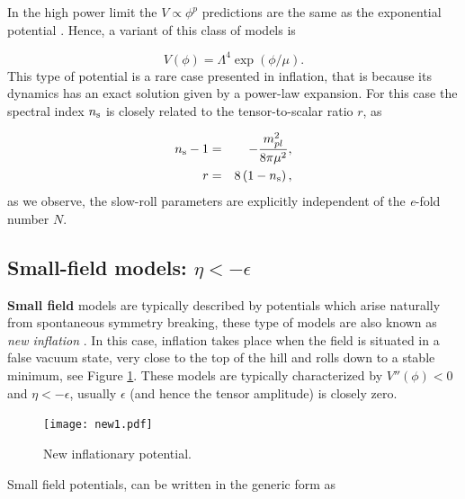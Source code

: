 \documentclass{rmaa}
\begin{document}
\noindent
In the high power limit the $V \propto \phi^p$ predictions are the same as the exponential 
potential \citep{La}. Hence, a variant of this class of models is 

\begin{equation}
V\left(\phi\right) = \Lambda^4 \exp\left(\phi / \mu\right).
\end{equation}
%
 This type of potential is a rare case presented in inflation, that is because its 
 dynamics has an exact solution given by a power-law expansion.
 For this case the spectral index $n_{\rm s}$ is closely related to the tensor-to-scalar ratio $r$, as 

\begin{eqnarray}
n_{\rm s}-1&=&-\frac{m^2_{pl}}{8\pi \mu^2}, \nonumber \\
r &=& 8 \left(1 - n_{\rm s}\right),
\end{eqnarray}
%
as we observe, the slow-roll parameters are explicitly independent of the \textit{e}-fold number $N$. 

\subsection{Small-field models: $\eta < -\epsilon$}


\textbf{Small field} models are typically described by potentials which arise 
naturally from spontaneous symmetry breaking, these type of models are also
known as \textit{new inflation} \citep{Steinhardt, Linde2}. 
In this case, inflation takes place when the field is situated in a false vacuum state,
very close to the top of the hill and rolls down to a stable minimum, see Figure \ref{fig:new2}. 
These models are typically characterized by $V''\left(\phi\right) < 0$
and $\eta < -\epsilon$, usually $\epsilon$ (and hence the tensor amplitude)
is closely zero. 

 \begin{figure}
 \begin{center}
  \texttt{[image: new1.pdf]}
	\caption{New inflationary potential.}
	\label{fig:new2}
 \end{center}	
\end{figure}

\noindent
Small field potentials, can be written in the generic form as
\end{document}

